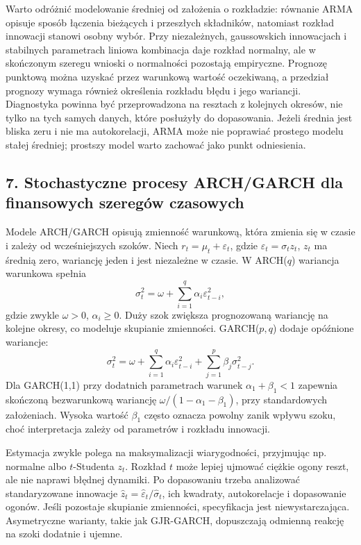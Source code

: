 \documentclass[11pt,a4paper]{article}
\begin{document}
Warto odróżnić modelowanie średniej od założenia o rozkładzie: równanie ARMA opisuje sposób łączenia bieżących i przeszłych składników, natomiast rozkład innowacji stanowi osobny wybór. Przy niezależnych, gaussowskich innowacjach i stabilnych parametrach liniowa kombinacja daje rozkład normalny, ale w skończonym szeregu wnioski o normalności pozostają empiryczne. Prognozę punktową można uzyskać przez warunkową wartość oczekiwaną, a przedział prognozy wymaga również określenia rozkładu błędu i jego wariancji. Diagnostyka powinna być przeprowadzona na resztach z kolejnych okresów, nie tylko na tych samych danych, które posłużyły do dopasowania. Jeżeli średnia jest bliska zeru i nie ma autokorelacji, ARMA może nie poprawiać prostego modelu stałej średniej; prostszy model warto zachować jako punkt odniesienia.

\subsection{7. Stochastyczne procesy ARCH/GARCH dla finansowych szeregów czasowych}

Modele ARCH/GARCH opisują zmienność warunkową, która zmienia się w czasie i zależy od wcześniejszych szoków. Niech \(r_t=\mu_t+\varepsilon_t\), gdzie \(\varepsilon_t=\sigma_t z_t\), \(z_t\) ma średnią zero, wariancję jeden i jest niezależne w czasie. W ARCH(\(q\)) wariancja warunkowa spełnia
\[
\sigma_t^2=\omega+\sum_{i=1}^{q}\alpha_i\varepsilon_{t-i}^2,
\]
gdzie zwykle \(\omega>0\), \(\alpha_i\geq0\). Duży szok zwiększa prognozowaną wariancję na kolejne okresy, co modeluje skupianie zmienności. GARCH(\(p,q\)) dodaje opóźnione wariancje:
\[
\sigma_t^2=\omega+\sum_{i=1}^{q}\alpha_i\varepsilon_{t-i}^2+
\sum_{j=1}^{p}\beta_j\sigma_{t-j}^2.
\]
Dla GARCH(1,1) przy dodatnich parametrach warunek \(\alpha_1+\beta_1<1\) zapewnia skończoną bezwarunkową wariancję \(\omega/(1-\alpha_1-\beta_1)\), przy standardowych założeniach. Wysoka wartość \(\beta_1\) często oznacza powolny zanik wpływu szoku, choć interpretacja zależy od parametrów i rozkładu innowacji.

Estymacja zwykle polega na maksymalizacji wiarygodności, przyjmując np. normalne albo \(t\)-Studenta \(z_t\). Rozkład \(t\) może lepiej ujmować ciężkie ogony reszt, ale nie naprawi błędnej dynamiki. Po dopasowaniu trzeba analizować standaryzowane innowacje \(\hat z_t=\hat\varepsilon_t/\hat\sigma_t\), ich kwadraty, autokorelacje i dopasowanie ogonów. Jeśli pozostaje skupianie zmienności, specyfikacja jest niewystarczająca. Asymetryczne warianty, takie jak GJR-GARCH, dopuszczają odmienną reakcję na szoki dodatnie i ujemne.
\end{document}
